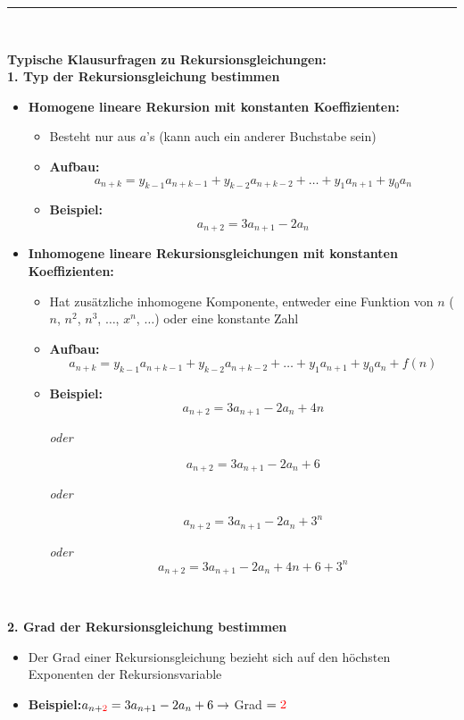 \hrule\

\textbf{Typische Klausurfragen zu Rekursionsgleichungen:}\\

\textbf{1. Typ der Rekursionsgleichung bestimmen}

\begin{itemize}
\item \textbf{Homogene lineare Rekursion mit konstanten Koeffizienten:}
\begin{itemize}
\item Besteht nur aus $a$'s (kann auch ein anderer Buchstabe sein)
\item \textbf{Aufbau:} $$a_{n+k} = y_{k-1}a_{n+k-1} + y_{k-2}a_{n+k-2} + \dots + y_{1}a_{n+1} + y_{0}a_{n}$$
\item \textbf{Beispiel:} $$a_{n+2} = 3a_{n+1} - 2a_n$$
\end{itemize}
\item \textbf{Inhomogene lineare Rekursionsgleichungen mit konstanten Koeffizienten:}
\begin{itemize}
\item Hat zusätzliche inhomogene Komponente, entweder eine Funktion von $n$ ($n$, $n^2$, $n^3$, $\dots$, $x^n$, $\dots$) oder eine konstante Zahl
\item \textbf{Aufbau:} $$a_{n+k} = y_{k-1}a_{n+k-1} + y_{k-2}a_{n+k-2} + \dots + y_{1}a_{n+1} + y_{0}a_{n} + f(n)$$
\item \textbf{Beispiel:} $$a_{n+2} = 3a_{n+1} - 2a_n + 4n$$ \begin{center}\textit{oder}
\end{center} $$a_{n+2} = 3a_{n+1} - 2a_n + 6$$ \begin{center}\textit{oder}
\end{center} $$a_{n+2} = 3a_{n+1} - 2a_n + 3^n$$ \begin{center}\textit{oder}  $$a_{n+2} = 3a_{n+1} - 2a_n + 4n + 6 + 3^n$$
\end{center}
\end{itemize}
\end{itemize}\

\textbf{2. Grad der Rekursionsgleichung bestimmen}

\begin{itemize}
\item Der Grad einer Rekursionsgleichung bezieht sich auf den höchsten Exponenten der Rekursionsvariable
\item \textbf{Beispiel:}$a_{n+{\color{red}2}} = 3a_{n+1} - 2a_n + 6 \rightarrow$ Grad $= {\color{red}2}$
\end{itemize}\
\\

